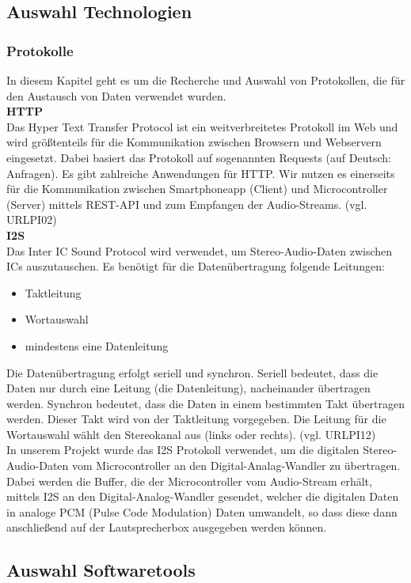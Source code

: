\documentclass[]{article}
\begin{document}
\subsection{Auswahl Technologien}
\subsubsection{Protokolle}
In diesem Kapitel geht es um die Recherche und Auswahl von Protokollen, die für den Austausch von Daten verwendet wurden.
\newline \\
\textbf{HTTP} \\
Das Hyper Text Transfer Protocol ist ein weitverbreitetes Protokoll im Web und wird größtenteils für die Kommunikation zwischen Browsern und Webservern eingesetzt. Dabei basiert das Protokoll auf sogenannten \glqq Requests\grqq{} (auf Deutsch: Anfragen). Es gibt zahlreiche Anwendungen für HTTP. Wir nutzen es einerseits für die Kommunikation zwischen Smartphoneapp (Client) und Microcontroller (Server) mittels REST-API und zum Empfangen der Audio-Streams. (vgl. URLPI02) \newline \\
\textbf{I2S}\\
Das Inter IC Sound Protocol wird verwendet, um Stereo-Audio-Daten zwischen ICs auszutauschen. Es benötigt für die Datenübertragung folgende Leitungen:
\begin{itemize}
\item Taktleitung
\item Wortauswahl
\item mindestens eine Datenleitung
\end{itemize}
Die Datenübertragung erfolgt seriell und synchron. Seriell bedeutet, dass die Daten nur durch eine Leitung (die Datenleitung), nacheinander übertragen werden. Synchron bedeutet, dass die Daten in einem bestimmten Takt übertragen werden. Dieser Takt wird von der Taktleitung vorgegeben. Die Leitung für die Wortauswahl wählt den Stereokanal aus (links oder rechts). (vgl. URLPI12) \\
In unserem Projekt wurde das I2S Protokoll verwendet, um die digitalen Stereo-Audio-Daten vom Microcontroller an den Digital-Analag-Wandler zu übertragen.
Dabei werden die Buffer, die der Microcontroller vom Audio-Stream erhält, mittels I2S an den Digital-Analog-Wandler gesendet, welcher die digitalen Daten in analoge PCM (Pulse Code Modulation) Daten umwandelt, so dass diese dann anschließend auf der Lautsprecherbox ausgegeben werden können.
\subsection{Auswahl Softwaretools}
\end{document}
